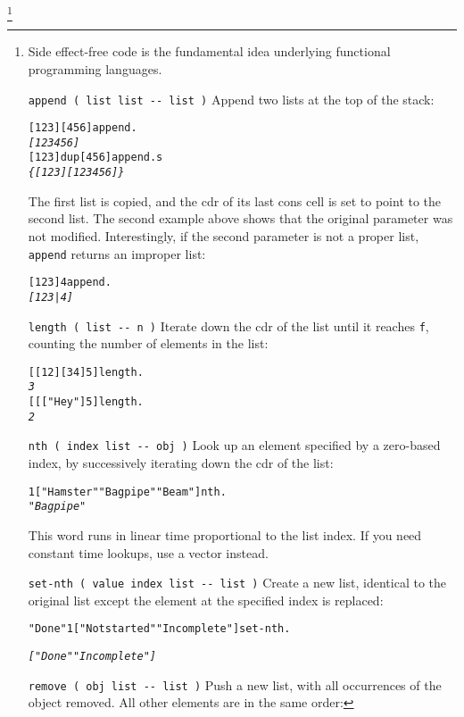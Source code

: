 \documentclass[english]{article}
\begin{document}
\footnote{Side effect-free code is the fundamental idea underlying functional
programming languages.

\texttt{append ( list list -{}- list )} Append two lists at the
top of the stack:

\begin{alltt}
{[} 1 2 3 {]} {[} 4 5 6 {]} append .
\emph{{[} 1 2 3 4 5 6 {]}}
{[} 1 2 3 {]} dup {[} 4 5 6 {]} append .s
\emph{\{ {[} 1 2 3 {]} {[} 1 2 3 4 5 6 {]} \}}
\end{alltt}

The first list is copied, and the cdr of its last cons cell is set
to point to the second list. The second example above shows that the original
parameter was not modified. Interestingly, if the second parameter
is not a proper list, \texttt{append} returns an improper list:

\begin{alltt}
{[} 1 2 3 {]} 4 append .
\emph{{[} 1 2 3 | 4 {]}}
\end{alltt}

\texttt{length ( list -{}- n )} Iterate down the cdr of the list until
it reaches \texttt{f}, counting the number of elements in the list:

\begin{alltt}
{[} {[} 1 2 {]} {[} 3 4 {]} 5 {]} length .
\emph{3}
{[} {[} {[} "Hey" {]} 5 {]} length .
\emph{2}
\end{alltt}

\texttt{nth ( index list -{}- obj )} Look up an element specified
by a zero-based index, by successively iterating down the cdr of the
list:

\begin{alltt}
1 {[} "Hamster" "Bagpipe" "Beam" {]} nth .
\emph{"Bagpipe"}
\end{alltt}

This word runs in linear time proportional to the list index. If you
need constant time lookups, use a vector instead.

\texttt{set-nth ( value index list -{}- list )} Create a new list,
identical to the original list except the element at the specified
index is replaced:

\begin{alltt}
"Done" 1 {[} "Not started" "Incomplete" {]} set-nth .

\emph{{[} "Done" "Incomplete" {]}}
\end{alltt}

\texttt{remove ( obj list -{}- list )} Push a new list, with all occurrences
of the object removed. All other elements are in the same order:

}
\end{document}
